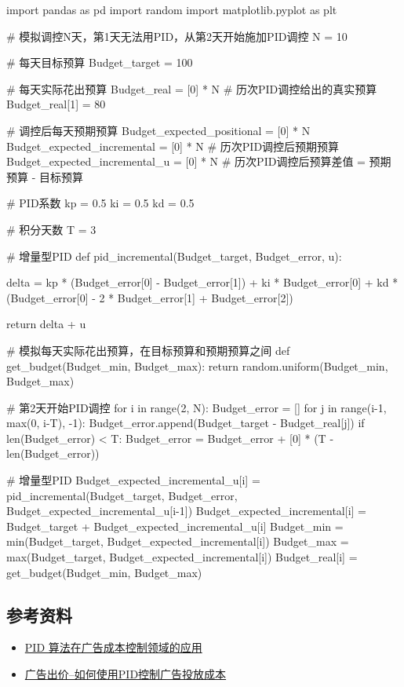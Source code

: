 \begin{python}
import pandas as pd
import random
import matplotlib.pyplot as plt

# 模拟调控N天，第1天无法用PID，从第2天开始施加PID调控
N = 10

# 每天目标预算
Budget_target = 100

# 每天实际花出预算
Budget_real = [0] * N                       # 历次PID调控给出的真实预算
Budget_real[1] = 80

# 调控后每天预期预算
Budget_expected_positional = [0] * N
Budget_expected_incremental = [0] * N       # 历次PID调控后预期预算
Budget_expected_incremental_u = [0] * N     # 历次PID调控后预算差值 = 预期预算 - 目标预算

# PID系数
kp = 0.5
ki = 0.5
kd = 0.5

# 积分天数
T = 3

# 增量型PID
def pid_incremental(Budget_target, Budget_error, u):

  delta = kp * (Budget_error[0] - Budget_error[1]) + ki * Budget_error[0] + kd * (Budget_error[0] - 2 * Budget_error[1] + Budget_error[2])

  return delta + u

# 模拟每天实际花出预算，在目标预算和预期预算之间
def get_budget(Budget_min, Budget_max):
  return random.uniform(Budget_min, Budget_max)

# 第2天开始PID调控
for i in range(2, N):
  Budget_error = []
  for j in range(i-1, max(0, i-T), -1):
    Budget_error.append(Budget_target - Budget_real[j])
  if len(Budget_error) < T:
    Budget_error = Budget_error + [0] * (T - len(Budget_error))

  # 增量型PID
  Budget_expected_incremental_u[i] = pid_incremental(Budget_target, Budget_error, Budget_expected_incremental_u[i-1])
  Budget_expected_incremental[i] = Budget_target + Budget_expected_incremental_u[i]
  Budget_min = min(Budget_target, Budget_expected_incremental[i])
  Budget_max = max(Budget_target, Budget_expected_incremental[i])
  Budget_real[i] = get_budget(Budget_min, Budget_max)
\end{python}

\subsection{参考资料}
\begin{itemize}
    \item \href{https://www.infoq.cn/article/akkwpvsnium9tmhhuu3f}{PID 算法在广告成本控制领域的应用}
    \item \href{https://www.zhihu.com/tardis/zm/art/139244173?source_id=1003}{广告出价--如何使用PID控制广告投放成本}
\end{itemize}
\newpage

